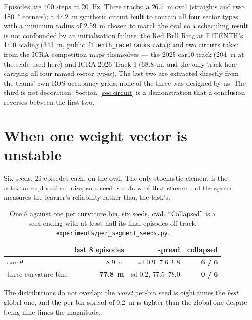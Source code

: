 \documentclass[letterpaper, 10 pt, conference]{ieeeconf}
\begin{document}
Episodes are 400 steps at \SI{20}{\hertz}. Three tracks: a \SI{26.7}{\meter}
oval (straights and two \SI{180}{\degree} corners); a \SI{47.2}{\meter}
synthetic circuit built to contain all four sector types, with a minimum radius
of \SI{2.59}{\meter} chosen to match the oval so a scheduling result is not
confounded by an initialisation failure; the Red Bull Ring at F1TENTH's
1:10 scaling (\SI{343}{\meter}, public \texttt{f1tenth\_racetracks} data); and
two circuits taken from the ICRA competition maps themselves --- the 2025 car10
track (\SI{204}{\meter} at the scale used here) and ICRA 2026 Track 1
(\SI{68.8}{\meter}, and the only track here carrying all four named sector
types). The last two are extracted directly from the teams' own ROS occupancy
grids; none of the three was designed by us. The third is not decoration: Section~\ref{sec:circuit}
is a demonstration that a conclusion reverses between the first two.

\section{When one weight vector is unstable}\label{sec:seeds}
Six seeds, 26 episodes each, on the oval. The only stochastic element is the
actuator exploration noise, so a seed is a draw of that stream and the spread
measures the learner's reliability rather than the task's.

\begin{table}[t]
  \centering
  \caption{One $\theta$ against one per curvature bin, six seeds, oval.
  ``Collapsed'' is a seed ending with at least half its final episodes
  off-track. \texttt{experiments/per\_segment\_seeds.py}.}
  \label{tab:seeds}
  \begin{tabular}{lrrr}
    \toprule
    & last 8 episodes & spread & collapsed \\
    \midrule
    one $\theta$          & \SI{8.9}{\meter}  & sd 0.9, 7.6--9.8   & \textbf{6 / 6} \\
    three curvature bins  & \textbf{\SI{77.8}{\meter}} & sd 0.2, 77.5--78.0 & \textbf{0 / 6} \\
    \bottomrule
  \end{tabular}
\end{table}

The distributions do not overlap: the \emph{worst} per-bin seed is eight times
the \emph{best} global one, and the per-bin spread of \SI{0.2}{\meter} is
tighter than the global one despite being nine times the magnitude.
\end{document}
